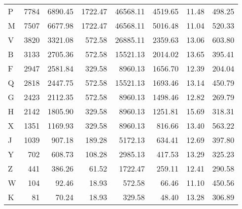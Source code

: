 \begin{tabular}{lrrrrrrr}
     P &          7784 &           6890.45 &           1722.47 &          46568.11 &             4519.65 &                   11.48 &                  498.25 \\
     M &          7507 &           6677.98 &           1722.47 &          46568.11 &             5016.48 &                   11.04 &                  520.33 \\
     V &          3820 &           3321.08 &            572.58 &          26885.11 &             2359.63 &                   13.06 &                  603.80 \\
     B &          3133 &           2705.36 &            572.58 &          15521.13 &             2014.02 &                   13.65 &                  395.41 \\
     F &          2947 &           2581.84 &            329.58 &           8960.13 &             1656.70 &                   12.39 &                  204.04 \\
     Q &          2818 &           2447.75 &            572.58 &          15521.13 &             1693.46 &                   13.14 &                  450.79 \\
     G &          2423 &           2112.35 &            572.58 &           8960.13 &             1498.46 &                   12.82 &                  269.79 \\
     H &          2142 &           1805.90 &            329.58 &           8960.13 &             1251.81 &                   15.69 &                  318.31 \\
     X &          1351 &           1169.93 &            329.58 &           8960.13 &              816.66 &                   13.40 &                  563.22 \\
     J &          1039 &            907.18 &            189.28 &           5172.13 &              634.41 &                   12.69 &                  397.80 \\
     Y &           702 &            608.73 &            108.28 &           2985.13 &              417.53 &                   13.29 &                  325.23 \\
     Z &           441 &            386.26 &             61.52 &           1722.47 &              259.11 &                   12.41 &                  290.58 \\
     W &           104 &             92.46 &             18.93 &            572.58 &               66.46 &                   11.10 &                  450.56 \\
     K &            81 &             70.24 &             18.93 &            329.58 &               48.40 &                   13.28 &                  306.89 \\
\bottomrule
\end{tabular}
